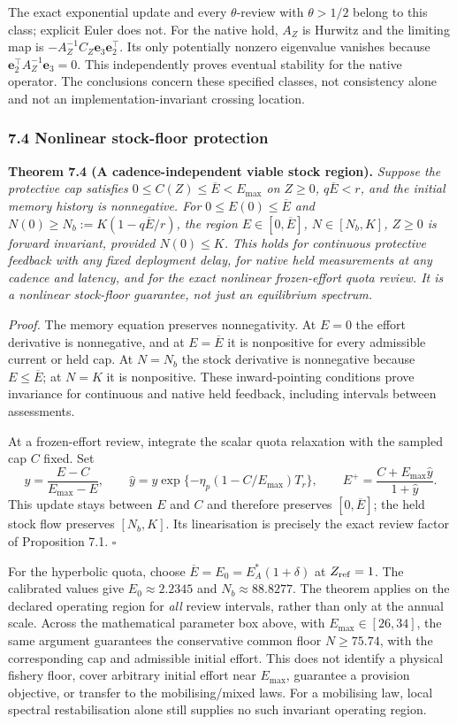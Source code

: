 The exact exponential update and every $\theta$-review with $\theta>1/2$ belong to this class; explicit Euler does not. For the native hold, $A_Z$ is Hurwitz and the limiting map is $-A_Z^{-1}C_Z\mathbf e_3\mathbf e_2^\top$. Its only potentially nonzero eigenvalue vanishes because $\mathbf e_2^\top A_Z^{-1}\mathbf e_3=0$. This independently proves eventual stability for the native operator. The conclusions concern these specified classes, not consistency alone and not an implementation-invariant crossing location.

\subsubsection{7.4 Nonlinear stock-floor protection}

\textbf{Theorem 7.4 (A cadence-independent viable stock region).}
\emph{Suppose the protective cap satisfies $0\le C(Z)\le\overline E<E_{\max}$ on $Z\ge0$, $q\overline E<r$, and the initial memory history is nonnegative. For $0\le E(0)\le\overline E$ and $N(0)\ge N_b:=K(1-q\overline E/r)$, the region $E\in[0,\overline E]$, $N\in[N_b,K]$, $Z\ge0$ is forward invariant, provided $N(0)\le K$. This holds for continuous protective feedback with any fixed deployment delay, for native held measurements at any cadence and latency, and for the exact nonlinear frozen-effort quota review. It is a nonlinear stock-floor guarantee, not just an equilibrium spectrum.}

\emph{Proof.} The memory equation preserves nonnegativity. At $E=0$ the effort derivative is nonnegative, and at $E=\overline E$ it is nonpositive for every admissible current or held cap. At $N=N_b$ the stock derivative is nonnegative because $E\le\overline E$; at $N=K$ it is nonpositive. These inward-pointing conditions prove invariance for continuous and native held feedback, including intervals between assessments.

At a frozen-effort review, integrate the scalar quota relaxation with the sampled cap $C$ fixed. Set
\[
y=\frac{E-C}{E_{\max}-E},\qquad
\widehat y=y\exp\{-\eta_p(1-C/E_{\max})T_r\},\qquad
E^+=\frac{C+E_{\max}\widehat y}{1+\widehat y}.
\]
This update stays between $E$ and $C$ and therefore preserves $[0,\overline E]$; the held stock flow preserves $[N_b,K]$. Its linearisation is precisely the exact review factor of Proposition 7.1. \ensuremath{\square}

For the hyperbolic quota, choose $\overline E=E_0=E_A^*(1+\delta)$ at $Z_{\rm ref}=1$. The calibrated values give $E_0\approx2.2345$ and $N_b\approx88.8277$. The theorem applies on the declared operating region for \emph{all} review intervals, rather than only at the annual scale. Across the mathematical parameter box above, with $E_{\max}\in[26,34]$, the same argument guarantees the conservative common floor $N\ge75.74$, with the corresponding cap and admissible initial effort. This does not identify a physical fishery floor, cover arbitrary initial effort near $E_{\max}$, guarantee a provision objective, or transfer to the mobilising/mixed laws. For a mobilising law, local spectral restabilisation alone still supplies no such invariant operating region.
